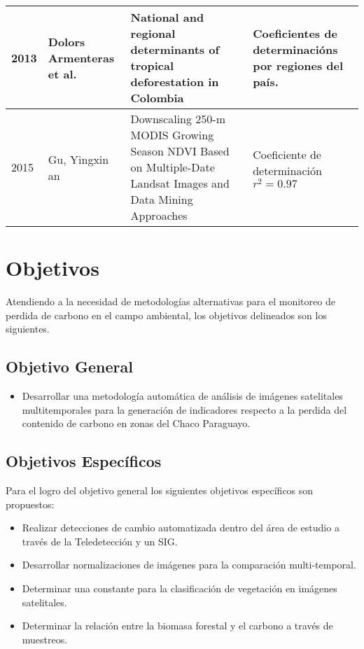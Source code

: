 \begin{table}[!hbtp]
\begin{tabular}{|p{3cm}|p{3cm}|p{3cm}|p{3cm}|}
		2013          & Dolors Armenteras et al.                               & National and regional determinants of tropical deforestation in Colombia                                                                                               & Coeficientes de determinaci\'ons por regiones del pa\'is.                                 \\ \hline
		2015          & Gu, Yingxin an                                         & Downscaling 250-m MODIS Growing Season NDVI Based on Multiple-Date Landsat Images and Data Mining Approaches                                                           & Coeficiente de determinaci\'on $ r^{2}=0.97 $                                             \\ \hline
	\end{tabular}
\end{table}

\section{Objetivos}
Atendiendo a la necesidad de metodolog\'ias alternativas para el monitoreo de perdida de carbono en el campo ambiental, los objetivos delineados son los siguientes.

\subsection{Objetivo General}

\begin{itemize}
\item Desarrollar una metodolog\'ia autom\'atica de an\'alisis de im\'agenes satelitales multitemporales para la generaci\'on de indicadores respecto a la perdida del contenido de carbono en zonas del Chaco Paraguayo.
\end{itemize}
\subsection{Objetivos Específicos}
Para el logro del objetivo general los siguientes objetivos espec\'ificos son propuestos:
\begin{itemize}


\item Realizar detecciones de cambio automatizada dentro del \'area de estudio a trav\'es de la Teledetecci\'on y un SIG.   
\item Desarrollar normalizaciones de im\'agenes para la comparación multi-temporal. 
\item Determinar una constante para la clasificaci\'on de vegetaci\'on en im\'agenes satelitales.
\item Determinar la relación entre la biomasa forestal y el carbono a trav\'es de muestreos.
 
    


\end{itemize}



